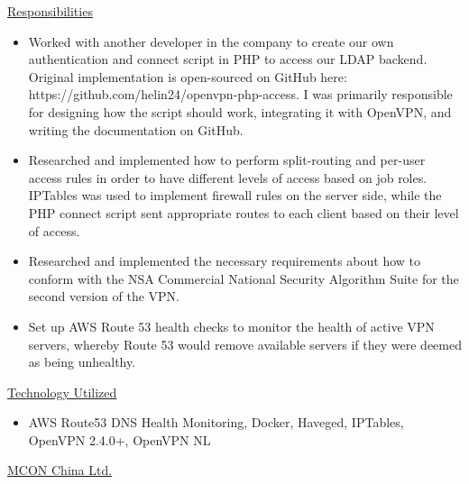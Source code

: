 \documentclass[a4paper,11pt]{article}
\newcommand{\resitem}[1]{\item #1 \vspace{-2pt}}
\begin{document}
\begin{itemize}
        \underline{Responsibilities}
        \begin{itemize}
            \resitem{Worked with another developer in the company to create our own authentication and connect script in PHP to access our LDAP backend. Original implementation is open-sourced on GitHub here: https://github.com/helin24/openvpn-php-access. I was primarily responsible for designing how the script should work, integrating it with OpenVPN, and writing the documentation on GitHub.}
            \resitem{Researched and implemented how to perform split-routing and per-user access rules in order to have different levels of access based on job roles. IPTables was used to implement firewall rules on the server side, while the PHP connect script sent appropriate routes to each client based on their level of access.}
            \resitem{Researched and implemented the necessary requirements about how to conform with the NSA Commercial National Security Algorithm Suite for the second version of the VPN.}
            \resitem{Set up AWS Route 53 health checks to monitor the health of active VPN servers, whereby Route 53 would remove available servers if they were deemed as being unhealthy.}
        \end{itemize}

        \underline{Technology Utilized}
        \begin{itemize}
            \resitem{AWS Route53 DNS Health Monitoring, Docker, Haveged, IPTables, OpenVPN 2.4.0+, OpenVPN NL}
        \end{itemize}

\end{itemize}

\underline{MCON China Ltd.}
\linebreak
\end{document}

